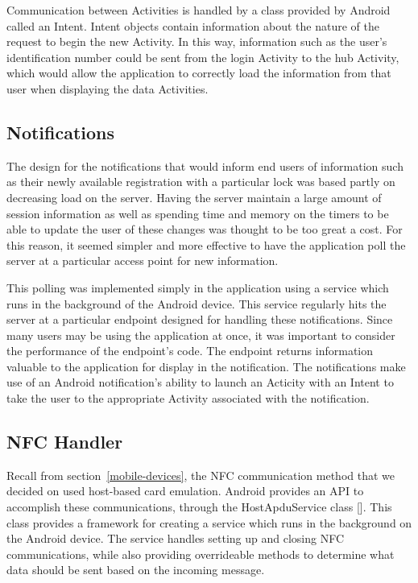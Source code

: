\documentclass[12pt]{report}
\let\Oldsubsection\subsection
\renewcommand{\subsection}{\FloatBarrier\Oldsubsection}
\begin{document}
Communication between Activities is handled by a class provided by Android called an Intent. Intent objects contain
information about the nature of the request to begin the new Activity. In this way, information such as the user's
identification number could be sent from the login Activity to the hub Activity, which would allow the application to
correctly load the information from that user when displaying the data Activities.


\subsection{Notifications} \label{notifications}

The design for the notifications that would inform end users of information such as their newly available registration
with a particular lock was based partly on decreasing load on the server. Having the server maintain a large amount of
session information as well as spending time and memory on the timers to be able to update the user of these changes
was thought to be too great a cost. For this reason, it seemed simpler and more effective to have the application poll
the server at a particular access point for new information.

This polling was implemented simply in the application using a service which runs in the background of the Android
device. This service regularly hits the server at a particular endpoint designed for handling these notifications. Since
many users may be using the application at once, it was important to consider the performance of the endpoint's code.
The endpoint returns information valuable to the application for display in the notification. The notifications make use
of an Android notification's ability to launch an Acticity with an Intent to take the user to the appropriate Activity
associated with the notification.


\subsection{NFC Handler} \label{nfc-handler}

Recall from section~\ref{mobile-devices}, the NFC communication method that we decided on used host-based card emulation. Android provides
an API to accomplish these communications, through the HostApduService class []. This class provides a framework for
creating a service which runs in the background on the Android device. The service handles setting up and closing NFC
communications, while also providing overrideable methods to determine what data should be sent based on the incoming
message.
\end{document}

